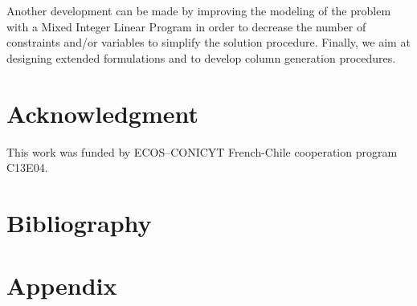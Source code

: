 Another development can be made by improving the modeling of the
problem with a Mixed Integer Linear Program in order to decrease the
number of constraints and/or variables to simplify the solution
procedure. Finally, we aim at designing extended formulations and to
develop column generation procedures.

\section*{Acknowledgment}

This work was funded by ECOS--CONICYT French-Chile cooperation program
C13E04.

\section*{Bibliography}
\begin{bibunit}[alpha]
\nocite{IESM}
\nocite*
\putbib[IESM]
\end{bibunit}

\newpage
\section*{Appendix}
~


